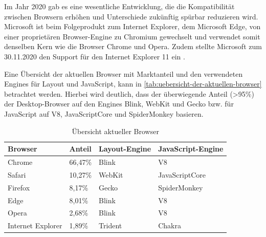Im Jahr 2020 gab es eine wesentliche Entwicklung, die die Kompatibilität zwischen Browsern erhöhen und Unterschiede zukünftig spürbar reduzieren wird. Microsoft ist beim Folgeprodukt zum Internet Explorer, dem Microsoft Edge, von einer proprietären Browser-Engine zu Chromium gewechselt \cite{MicrosoftEdgeChromium} und verwendet somit denselben Kern wie die Browser Chrome und Opera. Zudem stellte Microsoft zum 30.11.2020 den Support für den Internet Explorer 11 ein \cite{MicrosoftInternetExplorerDeprecation}.

Eine Übersicht der aktuellen Browser mit Marktanteil und den verwendeten Engines für Layout und JavaScript, kann in \autoref{tab:uebersicht-der-aktuellen-browser} betrachtet werden. Hierbei wird deutlich, dass der überwiegende Anteil (>95\%) der Desktop-Browser auf den Engines Blink, WebKit und Gecko bzw. für JavaScript auf V8, JavaScriptCore und SpiderMonkey basieren.

\begin{table}[H]
\centering
\begin{tabular}{|l|l|l|l|}
  \hline
  Browser & Anteil        & Layout-Engine  & JavaScript-Engine \\
  \hline
  Chrome  & 66,47\%       & Blink          & V8                \\
  \hline
  Safari  & 10,27\%       & WebKit         & JavaScriptCore    \\
  \hline
  Firefox & 8,17\%        & Gecko          & SpiderMonkey      \\
  \hline
  Edge    & 8,01\%        & Blink          & V8                \\
  \hline
  Opera   & 2,68\%        & Blink          & V8                \\
  \hline
  Internet Explorer & 1,89\% & Trident     & Chakra            \\
  \hline
\end{tabular}
\caption{Übersicht aktueller Browser \cite{StatCounterBrowserMarketshare} \cite{CompatibilityAndDefaults}}
	\label{tab:uebersicht-der-aktuellen-browser}
\end{table}